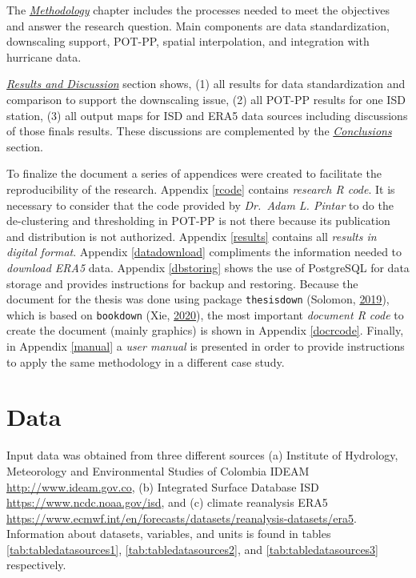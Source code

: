 \documentclass[12pt,oneside]{reedthesis}
\begin{document}
The \emph{\protect\hyperlink{rmd-method}{Methodology}} chapter includes the processes needed to meet the objectives and answer the research question. Main components are data standardization, downscaling support, POT-PP, spatial interpolation, and integration with hurricane data.

\emph{\protect\hyperlink{rmd-results}{Results and Discussion}} section shows, (1) all results for data standardization and comparison to support the downscaling issue, (2) all POT-PP results for one ISD station, (3) all output maps for ISD and ERA5 data sources including discussions of those finals results. These discussions are complemented by the \emph{\protect\hyperlink{conclusions}{Conclusions}} section.

To finalize the document a series of appendices were created to facilitate the reproducibility of the research. Appendix \ref{rcode} contains \emph{research R code}. It is necessary to consider that the code provided by \emph{Dr.~Adam L. Pintar} to do the de-clustering and thresholding in POT-PP is not there because its publication and distribution is not authorized. Appendix \ref{results} contains all \emph{results in digital format}. Appendix \ref{datadownload} compliments the information needed to \emph{download ERA5} data. Appendix \ref{dbstoring} shows the use of PostgreSQL for data storage and provides instructions for backup and restoring. Because the document for the thesis was done using package \texttt{thesisdown} (Solomon, \protect\hyperlink{ref-Solomon2019}{2019}), which is based on \texttt{bookdown} (Xie, \protect\hyperlink{ref-Xie2020}{2020}), the most important \emph{document R code} to create the document (mainly graphics) is shown in Appendix \ref{docrcode}. Finally, in Appendix \ref{manual} a \emph{user manual} is presented in order to provide instructions to apply the same methodology in a different case study.

\hypertarget{rmd-data}{%
\chapter{Data}\label{rmd-data}}

Input data was obtained from three different sources (a) Institute of Hydrology, Meteorology and Environmental Studies of Colombia IDEAM \url{http://www.ideam.gov.co}, (b) Integrated Surface Database ISD \url{https://www.ncdc.noaa.gov/isd}, and (c) climate reanalysis ERA5 \url{https://www.ecmwf.int/en/forecasts/datasets/reanalysis-datasets/era5}. Information about datasets, variables, and units is found in tables \ref{tab:tabledatasources1}, \ref{tab:tabledatasources2}, and \ref{tab:tabledatasources3} respectively.
\end{document}
